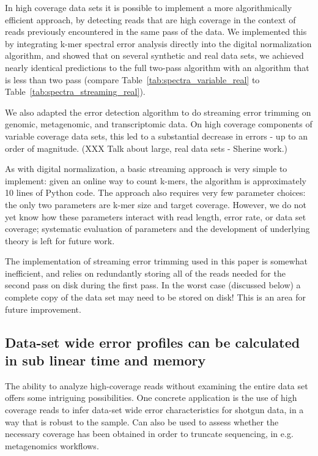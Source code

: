 \documentclass{article}
\begin{document}
In high coverage data sets it is possible to implement a more
algorithmically efficient approach, by detecting reads that are high
coverage in the context of reads previously encountered in the same
pass of the data.  We implemented this by integrating k-mer spectral
error analysis directly into the digital normalization algorithm, and
showed that on several synthetic and real data sets, we achieved
nearly identical predictions to the full two-pass algorithm with an
algorithm that is less than two pass (compare
Table~\ref{tab:spectra_variable_real} to
Table~\ref{tab:spectra_streaming_real}).

We also adapted the error detection algorithm to do streaming error
trimming on genomic, metagenomic, and transcriptomic data.  On high
coverage components of variable coverage data sets, this led to
a substantial decrease in errors - up to an order of magnitude.
(XXX Talk about large, real data sets - Sherine work.)

As with digital normalization, a basic streaming approach is very
simple to implement: given an online way to count k-mers, the
algorithm is approximately 10 lines of Python code.  The approach also
requires very few parameter choices: the only two parameters are k-mer
size and target coverage.  However, we do not yet know how these
parameters interact with read length, error rate, or data set
coverage; systematic evaluation of parameters and the development of
underlying theory is left for future work.

The implementation of streaming error trimming used in this paper is
somewhat inefficient, and relies on redundantly storing all of the
reads needed for the second pass on disk during the first pass.  In
the worst case (discussed below) a complete copy of the data set may
need to be stored on disk!  This is an area for future improvement.

\subsection{Data-set wide error profiles can be calculated in sub linear time and memory}

The ability to analyze high-coverage reads without examining the
entire data set offers some intriguing possibilities.  One concrete
application is the use of high coverage reads to infer data-set wide
error characteristics for shotgun data, in a way that is robust to the
sample.  Can also be used to assess whether the necessary coverage has
been obtained in order to truncate sequencing, in e.g. metagenomics
workflows.
\end{document}
